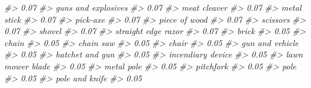 \documentclass[
]{krantz}
\makeatletter
\newenvironment{Shaded}{\begin{snugshade}}{\end{snugshade}}
\newcommand{\CommentTok}[1]{\textcolor[rgb]{0.37,0.37,0.37}{\textit{#1}}}
\newenvironment{kframe}{%
\medskip{}
\setlength{\fboxsep}{.8em}
 \def\at@end@of@kframe{}%
 \ifinner\ifhmode%
  \def\at@end@of@kframe{\end{minipage}}%
  \begin{minipage}{\columnwidth}%
 \fi\fi%
 \def\FrameCommand##1{\hskip\@totalleftmargin \hskip-\fboxsep
 \colorbox{shadecolor}{##1}\hskip-\fboxsep
     \hskip-\linewidth \hskip-\@totalleftmargin \hskip\columnwidth}%
 \MakeFramed {\advance\hsize-\width
   \@totalleftmargin\z@ \linewidth\hsize
   \@setminipage}}%
 {\par\unskip\endMakeFramed%
 \at@end@of@kframe}
\renewenvironment{Shaded}{\begin{kframe}}{\end{kframe}}
\makeatother
\begin{document}
\begin{Shaded}
\begin{Highlighting}[]
\CommentTok{\#\textgreater{}                             0.07 }
\CommentTok{\#\textgreater{}              guns and explosives }
\CommentTok{\#\textgreater{}                             0.07 }
\CommentTok{\#\textgreater{}                     meat cleaver }
\CommentTok{\#\textgreater{}                             0.07 }
\CommentTok{\#\textgreater{}                      metal stick }
\CommentTok{\#\textgreater{}                             0.07 }
\CommentTok{\#\textgreater{}                         pick{-}axe }
\CommentTok{\#\textgreater{}                             0.07 }
\CommentTok{\#\textgreater{}                    piece of wood }
\CommentTok{\#\textgreater{}                             0.07 }
\CommentTok{\#\textgreater{}                         scissors }
\CommentTok{\#\textgreater{}                             0.07 }
\CommentTok{\#\textgreater{}                           shovel }
\CommentTok{\#\textgreater{}                             0.07 }
\CommentTok{\#\textgreater{}              straight edge razor }
\CommentTok{\#\textgreater{}                             0.07 }
\CommentTok{\#\textgreater{}                            brick }
\CommentTok{\#\textgreater{}                             0.05 }
\CommentTok{\#\textgreater{}                            chain }
\CommentTok{\#\textgreater{}                             0.05 }
\CommentTok{\#\textgreater{}                        chain saw }
\CommentTok{\#\textgreater{}                             0.05 }
\CommentTok{\#\textgreater{}                            chair }
\CommentTok{\#\textgreater{}                             0.05 }
\CommentTok{\#\textgreater{}                  gun and vehicle }
\CommentTok{\#\textgreater{}                             0.05 }
\CommentTok{\#\textgreater{}                  hatchet and gun }
\CommentTok{\#\textgreater{}                             0.05 }
\CommentTok{\#\textgreater{}                incendiary device }
\CommentTok{\#\textgreater{}                             0.05 }
\CommentTok{\#\textgreater{}                 lawn mower blade }
\CommentTok{\#\textgreater{}                             0.05 }
\CommentTok{\#\textgreater{}                       metal pole }
\CommentTok{\#\textgreater{}                             0.05 }
\CommentTok{\#\textgreater{}                        pitchfork }
\CommentTok{\#\textgreater{}                             0.05 }
\CommentTok{\#\textgreater{}                             pole }
\CommentTok{\#\textgreater{}                             0.05 }
\CommentTok{\#\textgreater{}                   pole and knife }
\CommentTok{\#\textgreater{}                             0.05 }

\end{Highlighting}
\end{Shaded}
\end{document}

